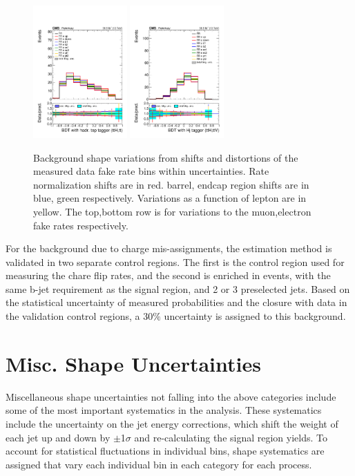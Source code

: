 \begin{figure}[htb]
        \includegraphics[width=0.32\textwidth]{ch10_figs/kinMVA_2lss_e_ttbar_withBDTv8.pdf}
        \includegraphics[width=0.32\textwidth]{ch10_figs/kinMVA_2lss_e_ttV_withHj.pdf}
        \caption[Variations in discrminant shape due to fake rate systematics]{Background shape variations from shifts and distortions of the measured data fake rate bins within uncertainties. 
          Rate normalization shifts are in red. barrel, endcap region shifts are in blue, green respectively. Variations as a function
          of lepton \pt are in yellow. The top,bottom row is for variations to the muon,electron fake rates respectively.}
        \label{fig:FRvars_shape}
\end{figure}

For the background due to charge mis-assignments, the estimation method is validated in two separate control regions.
The first is the control region used for measuring the chare flip rates, and the second is enriched in \ttbar events, with the same b-jet
requirement as the signal region, and 2 or 3 preselected jets. Based on the statistical uncertainty of measured probabilities
and the closure with data in the validation control regions, a 30$\%$ uncertainty is assigned to this background. 



\section{Misc. Shape Uncertainties}
Miscellaneous shape uncertainties not falling into the above categories include some of the most important systematics in the analysis.
These systematics include the uncertainty on the jet energy corrections, which  shift the weight of each jet up and down
by $\pm$1$\sigma$ and re-calculating the signal region yields. To account for statistical fluctuations in individual bins, shape systematics
are assigned that vary each individual bin in each category for each process. 




